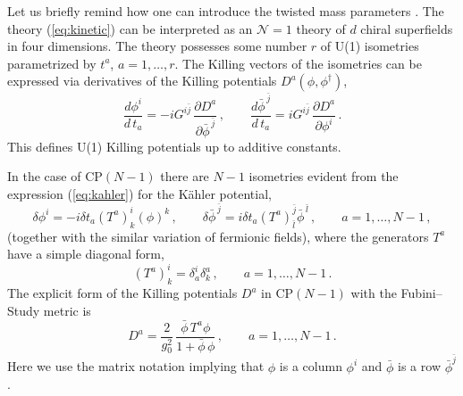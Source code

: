 \documentclass[epsfig,12pt]{article}
\def\beq{\begin{equation}}
\def\eeq{\end{equation}}
\def\beq{\begin{equation}}
\def\eeq{\end{equation}}
\begin{document}
Let us  briefly remind how one can introduce the twisted mass parameters \cite{twisted, Dor}.
The theory (\ref{eq:kinetic}) can be interpreted as an ${\mathcal N}=1$ theory of $d$ chiral superfields 
in four dimensions.  The theory possesses some number $r$ of U(1) isometries 
parametrized by $t^{a}$, $a=1,\ldots,r$.
The Killing vectors of the isometries can be expressed via derivatives of the Killing 
potentials $D^{a}(\phi, \phi^{\dagger})$,
\begin{equation}
\label{eq:KillD}
\frac{{d}\phi^{i}}{{  d}\,t_{a}}=-iG^{i\bar j}\,\frac{\partial D^{a}}{\partial \bar\phi^{ \,\bar j}}
\,,\qquad 
\frac{{d}\bar\phi^{ \,\bar j}}{{  d}\,t_{a}}=iG^{i\bar j}\,\frac{\partial D^{a}}{\partial \phi^{i}}\,.
\end{equation}
This defines U(1) Killing potentials up to additive constants.

In the case of  CP$(N\!-\!1)$ there are $N\!-\!1$ isometries 
 evident from the expression (\ref{eq:kahler}) for the K\"ahler potential, 
\begin{equation}
\label{eq:iso}
\delta\phi^{i}=-i\delta t_{a} (T^{a})^{i}_{k}(\phi)^{k}\,,\qquad 
\delta\bar\phi^{\,\bar j}=i\delta t_{a}(T^{a})^{\bar j}_{\bar l}\bar\phi^{\,\bar l}\,,
\qquad a=1,\ldots, N-1\,,
\end{equation}
(together with the similar variation of fermionic fields),
where the  generators $T^{a}$ have a simple diagonal form,
\begin{equation}
(T^{a})^{i}_{k}=\delta^{i}_{a}\delta^{a}_{k}\,, \qquad a=1,\ldots,N-1\,.
\end{equation}
 The explicit form of the Killing potentials $D^{a}$ in CP$(N\!-\!1)$ with the Fubini--Study metric is
\beq
\label{eq:KillF}
D^{a}=\frac{2}{g_{0}^{2}}\,\frac{\bar\phi\, T^{a}\phi}{1+\bar\phi\,\phi}\,,
\qquad a=1,\ldots,N-1\,.
\eeq
Here we use the matrix notation implying that $\phi$ is a column $\phi^{i}$ and 
$\bar\phi$ is a row $\bar\phi^{ \bar j}$.
\end{document}
